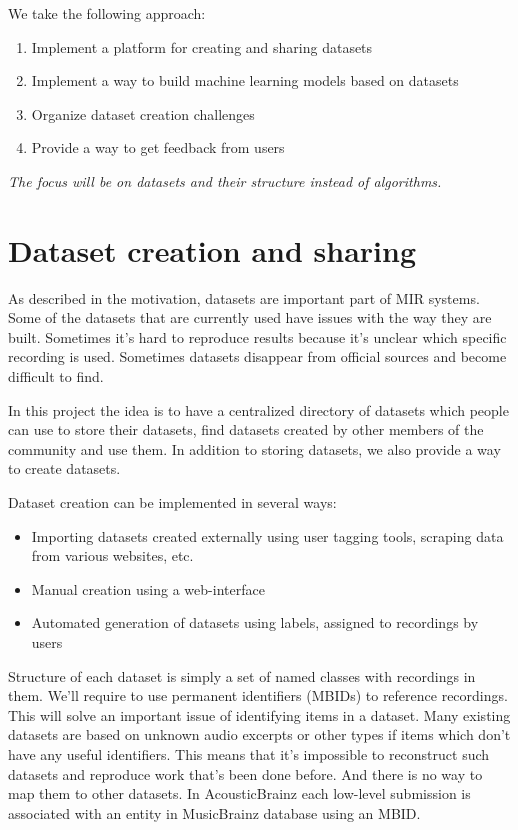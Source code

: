 We take the following approach:
\begin{enumerate}
    \item Implement a platform for creating and sharing datasets
    \item Implement a way to build machine learning models based on datasets
    \item Organize dataset creation challenges
    \item Provide a way to get feedback from users
\end{enumerate}

\emph{The focus will be on datasets and their structure instead of algorithms.}


\section{Dataset creation and sharing}

As described in the motivation, datasets are important part of MIR systems. Some of the datasets that are currently used have issues with the way they are built. Sometimes it's hard to reproduce results because it's unclear which specific recording is used. Sometimes datasets disappear from official sources and become difficult to find.

In this project the idea is to have a centralized directory of datasets which people can use to store their datasets, find datasets created by other members of the community and use them. In addition to storing datasets, we also provide a way to create datasets.

Dataset creation can be implemented in several ways:
\begin{itemize}
    \item Importing datasets created externally using user tagging tools, scraping data from various websites, etc.
    \item Manual creation using a web-interface
    \item Automated generation of datasets using labels, assigned to recordings by users
\end{itemize}

Structure of each dataset is simply a set of named classes with recordings in them. We'll require to use permanent identifiers (MBIDs) to reference recordings. This will solve an important issue of identifying items in a dataset. Many existing datasets are based on unknown audio excerpts or other types if items which don't have any useful identifiers. This means that it's impossible to reconstruct such datasets and reproduce work that's been done before. And there is no way to map them to other datasets. In AcousticBrainz each low-level submission is associated with an entity in MusicBrainz database using an MBID.

